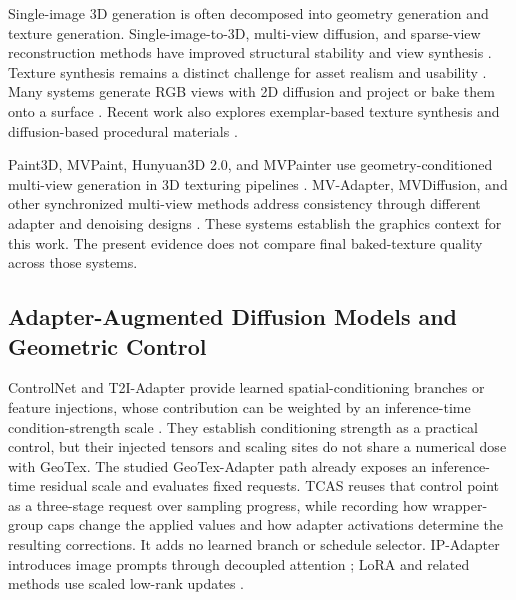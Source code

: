 \documentclass[times,twocolumn,final]{elsarticle}
\begin{document}
Single-image 3D generation is often decomposed into geometry generation and texture generation. Single-image-to-3D, multi-view diffusion, and sparse-view reconstruction methods have improved structural stability and view synthesis \cite{liu2023zero1to3,shi2023zero123pp,liu2023syncdreamer,long2023wonder3d,shi2024mvdream,wang2023imagedream,xu2024instantmesh,ke2024era3d}. Texture synthesis remains a distinct challenge for asset realism and usability \cite{perla2026survey}. Many systems generate RGB views with 2D diffusion and project or bake them onto a surface \cite{chen2023text2tex,richardson2023texture,poole2023dreamfusion,chen2023fantasia3d}. Recent work also explores exemplar-based texture synthesis and diffusion-based procedural materials \cite{guzman2026adaptive,lv2025interpretable}.

Paint3D, MVPaint, Hunyuan3D 2.0, and MVPainter use geometry-conditioned multi-view generation in 3D texturing pipelines \cite{zeng2024paint3d,cheng2024mvpaint,lai2025hunyuan3d,shao2025mvpainter}. MV-Adapter, MVDiffusion, and other synchronized multi-view methods address consistency through different adapter and denoising designs \cite{huang2024mvadapter,tang2023mvdiffusion,liu2024synchronized,xu2026wondertex}. These systems establish the graphics context for this work. The present evidence does not compare final baked-texture quality across those systems.

\subsection{Adapter-Augmented Diffusion Models and Geometric Control}
\label{subsec:adapter}

ControlNet and T2I-Adapter provide learned spatial-conditioning branches or feature injections, whose contribution can be weighted by an inference-time condition-strength scale \cite{mou2023t2iadapter,zhang2023controlnet}. They establish conditioning strength as a practical control, but their injected tensors and scaling sites do not share a numerical dose with GeoTex. The studied GeoTex-Adapter path already exposes an inference-time residual scale and evaluates fixed requests. TCAS reuses that control point as a three-stage request over sampling progress, while recording how wrapper-group caps change the applied values and how adapter activations determine the resulting corrections. It adds no learned branch or schedule selector. IP-Adapter introduces image prompts through decoupled attention \cite{ye2023ipadapter}; LoRA and related methods use scaled low-rank updates \cite{hu2022lora,liu2024dora,zhang2023adalora}.
\end{document}
